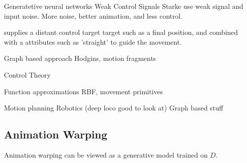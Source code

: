 Generatetive neural networks Weak Control Signals
    Starke use weak signal and input noise. More noise, better animation, and less control.

    \citep{lee18} supplies a distant control target target such as a final position, and combined with a attributes such as 'straight' to guide the movement.

Graph based approach 
    Hodgins, motion fragments

Control Theory

Function approximations 
    RBF, movement primitives

Motion planning
    Robotics (deep loco good to look at)
    Graph based stuff



\subsection{Animation Warping}
Animation warping can be viewed as a generative model trained on $D$. 

